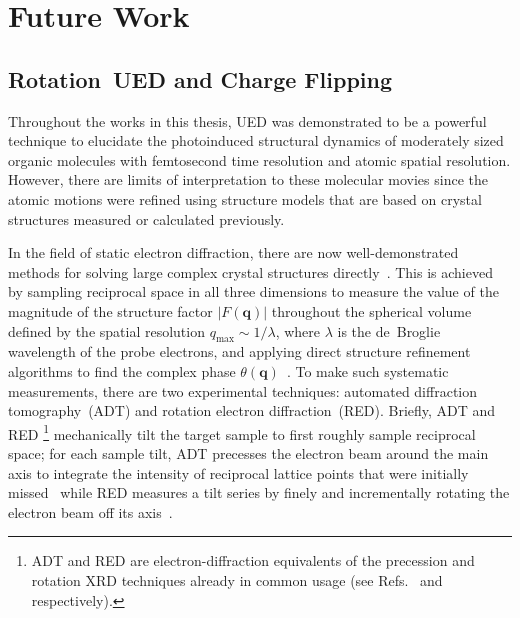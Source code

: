 
\chapter{Future Work}
\label{ch: future}


\section[Rotation~UED and Charge Flipping]{Rotation~UED and Charge Flipping}
\label{sec: rotation-CF}

Throughout the works in this thesis, UED was demonstrated to be a powerful technique
to elucidate the photoinduced structural dynamics of moderately sized organic molecules
with femtosecond time resolution and atomic spatial resolution.
%
However, there are limits of interpretation to these molecular movies
since the atomic motions were refined using structure models
that are based on crystal structures measured or calculated previously.

In the field of static electron diffraction, there are now well-demonstrated methods
for solving large complex crystal structures directly~\cite{Mugnaiolia2015}.
%
This is achieved by sampling reciprocal space in all three dimensions
to measure the value of the magnitude of the structure factor $|F(\boldsymbol{q})|$
throughout the spherical volume defined by the spatial resolution
$q_\text{max} \sim 1/\lambda$, where $\lambda$ is the de~Broglie wavelength of the probe electrons,
and applying direct structure refinement algorithms to find
the complex phase $\theta(\boldsymbol{q})$~\cite{Giacovazzo2011, ZouBook}.
%
To make such systematic measurements, there are two experimental techniques:
automated diffraction tomography~(ADT) and rotation electron diffraction~(RED).
%
Briefly, ADT and RED%
\footnote{ADT and RED are electron-diffraction equivalents of the precession and rotation XRD techniques
already in common usage (see Refs.~\cite{Xuong1968, Buerger1964} and~\cite{Arndt1973, ArndtWonacottBook}
respectively).} mechanically tilt the target sample to first roughly sample
reciprocal space; for each sample tilt, ADT precesses the electron beam around the main axis
to integrate the intensity of reciprocal lattice points
that were initially missed~\cite{Kolb2007, Kolb2008, Mugnaiolia2009}
while RED measures a tilt series by finely and incrementally rotating the electron beam
off its axis~\cite{Hovmoller2008, Zhang2010, Wan2013}.

